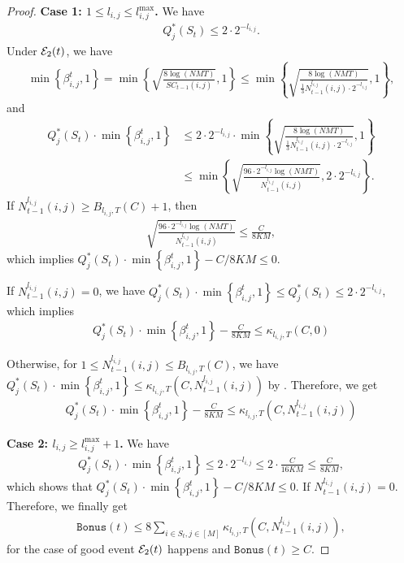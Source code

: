 \begin{lemma}
\begin{proof}
\noindent \textbf{Case 1: $1\le l_{i,j} \le l_{i,j}^{\max}$.} We have 
\begin{align*}
    Q^*_{j}(S_t) \le 2 \cdot 2^{-l_{i,j}}.
\end{align*}
Under ${\mathcal{E}}_2(t)$, we have
\begin{align*}
    \min \left\{\beta_{i,j}^t, 1\right\} = \min \left\{\sqrt{\frac{8 \log(NMT)}{ SC_{t-1}(i,j)}},1\right\} \leq \min\left\{\sqrt{\frac{8 \log(NMT)}{\frac{1}{3} N_{t-1}^{l_{i,j}}(i,j) \cdot 2^{-l_{i,j}}}}, 1\right\},
\end{align*}
and
\begin{equation}\label{eq:Qbeta-bound}
\begin{aligned}
    Q^*_{j}(S_t)\cdot \min \left\{\beta_{i,j}^t,1\right\} &\le 2 \cdot 2^{-l_{i,j}} \cdot \min\left\{\sqrt{\frac{8 \log(NMT)}{\frac{1}{3} N_{t-1}^{l_{i,j}}(i,j) \cdot 2^{-l_{i,j}}}}, 1\right\} \\
    &\le \min\left\{\sqrt{\frac{96 \cdot 2^{-l_{i,j}} \log(NMT)}{ N_{t-1}^{l_{i,j}}(i,j) }}, 2 \cdot 2^{-l_{i,j}}\right\}.
\end{aligned}
\end{equation}
If $N_{t-1}^{l_{i,j}}(i,j) \ge B_{l_{i,j},T}(C) + 1$, then
\begin{align*}
    \sqrt{\frac{96 \cdot 2^{-l_{i,j}} \log(NMT)}{ N_{t-1}^{l_{i,j}}(i,j) }} \le \frac{C}{8KM},
\end{align*}
which implies $Q^*_{j}(S_t)\cdot \min \left\{\beta_{i,j}^t,1\right\} - C/8KM \le 0$. 

If $N_{t-1}^{l_{i,j}}(i,j) = 0$, we have $Q^*_{j}(S_t)\cdot \min \left\{\beta_{i,j}^t,1\right\} \le Q^*_{j}(S_t) \le 2\cdot 2^{-l_{i,j}}$, which implies
\begin{align*}
    Q^*_{j}(S_t)\cdot \min \left\{\beta_{i,j}^t,1\right\} - \frac{C}{8KM} \le \kappa_{l_{i,j},T}(C, 0)
\end{align*}

Otherwise, for $1 \le N_{t-1}^{l_{i,j}}(i,j) \le B_{l_{i,j}, T}(C)$, we have $Q^*_{j}(S_t)\cdot \min \left\{\beta_{i,j}^t,1\right\} \le \kappa_{l_{i,j},T}(C, N_{t-1}^{l_{i,j}}(i,j))$ by . Therefore, we get
\begin{align*}
    Q^*_{j}(S_t)\cdot \min \left\{\beta_{i,j}^t,1\right\} - \frac{C}{8KM} \le \kappa_{l_{i,j},T}(C, N_{t-1}^{l_{i,j}}(i,j))
\end{align*}

\noindent \textbf{Case 2: $l_{i,j} \ge l_{i,j}^{\max} + 1$.} We have
\begin{align*}
    Q^*_{j}(S_t)\cdot \min \left\{\beta_{i,j}^t,1\right\} \le 2 \cdot 2^{-l_{i,j}} \le 2 \cdot \frac{C}{16KM} \le \frac{C}{8KM},
\end{align*}
which shows that $Q^*_{j}(S_t)\cdot \min \left\{\beta_{i,j}^t,1\right\} - C/8KM \le 0$. If $N_{t-1}^{l_{i,j}}(i,j) = 0$. Therefore, we finally get
\begin{align*}
    \texttt{Bonus}(t) \le 8\sum_{i\in S_t, j \in [M]} \kappa_{l_{i,j}, T}\left(C, N_{t-1}^{l_{i,j}}(i,j)\right),
\end{align*}
for the case of good event ${\mathcal{E}}_2(t)$ happens and $\texttt{Bonus}(t) \ge C$.


\end{proof}
\end{lemma}
